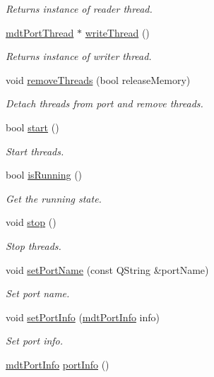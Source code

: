 \begin{DoxyCompactItemize}
\begin{DoxyCompactList}\small\item\em Returns instance of reader thread. \end{DoxyCompactList}\item 
\hyperlink{classmdt_port_thread}{mdtPortThread} $\ast$ \hyperlink{classmdt_port_manager_af44b6e9876e6687b1d4fe7e05ffd5a91}{writeThread} ()
\begin{DoxyCompactList}\small\item\em Returns instance of writer thread. \end{DoxyCompactList}\item 
void \hyperlink{classmdt_port_manager_aaa0a474183bcae0fff4fb9ef43023c25}{removeThreads} (bool releaseMemory)
\begin{DoxyCompactList}\small\item\em Detach threads from port and remove threads. \end{DoxyCompactList}\item 
bool \hyperlink{classmdt_port_manager_af1fb103ffafc227337a59c7e82f44fbc}{start} ()
\begin{DoxyCompactList}\small\item\em Start threads. \end{DoxyCompactList}\item 
bool \hyperlink{classmdt_port_manager_af460167e604b8b6e2e933a98b2b6b5a2}{isRunning} ()
\begin{DoxyCompactList}\small\item\em Get the running state. \end{DoxyCompactList}\item 
void \hyperlink{classmdt_port_manager_aacbf87cc3d9c37c87e21696f8a6514bd}{stop} ()
\begin{DoxyCompactList}\small\item\em Stop threads. \end{DoxyCompactList}\item 
void \hyperlink{classmdt_port_manager_a2b2ed690cbba9f544c6ac1b46684e59a}{setPortName} (const QString \&portName)
\begin{DoxyCompactList}\small\item\em Set port name. \end{DoxyCompactList}\item 
void \hyperlink{classmdt_port_manager_a7e2ef93ec2731e66aa2b2d5f7ce9bc1c}{setPortInfo} (\hyperlink{classmdt_port_info}{mdtPortInfo} info)
\begin{DoxyCompactList}\small\item\em Set port info. \end{DoxyCompactList}\item 
\hypertarget{classmdt_port_manager_a88109b455fc5a5f5adf0636f7450143e}{
\hyperlink{classmdt_port_info}{mdtPortInfo} \hyperlink{classmdt_port_manager_a88109b455fc5a5f5adf0636f7450143e}{portInfo} ()}
\label{classmdt_port_manager_a88109b455fc5a5f5adf0636f7450143e}


\end{DoxyCompactItemize}
